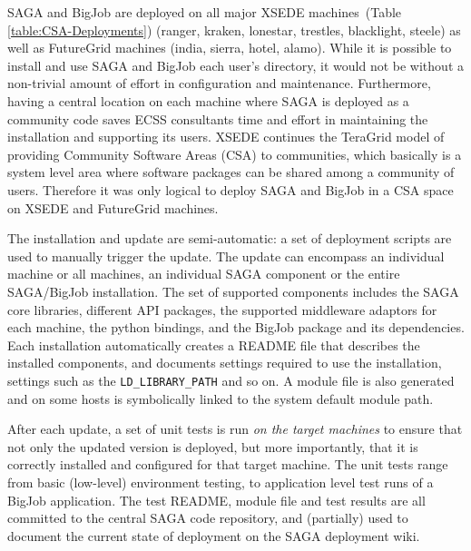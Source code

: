 \documentclass{sig-alternate}
\begin{document}
SAGA and BigJob are deployed on all major XSEDE
machines~(Table \ref{table:CSA-Deployments}) (ranger,
kraken, lonestar, trestles, blacklight, steele) as well as FutureGrid machines
(india, sierra, hotel, alamo). While it is possible to install and
use SAGA and BigJob each user's directory, it would not be without a non-trivial
amount of effort in configuration and maintenance. Furthermore, having a
central location on each machine where SAGA is deployed as a community code
saves ECSS consultants time and effort in maintaining the installation and
supporting its users. XSEDE continues the TeraGrid model of providing Community
Software Areas (CSA) to communities, which basically is a system
level area where software packages can be shared among a community of users.
Therefore it was only logical to deploy SAGA and BigJob in a CSA space on XSEDE
and FutureGrid machines.

The installation and update are semi-automatic: a set of deployment
scripts are used to manually trigger the update. The update can encompass an
individual machine or all machines, an individual SAGA component or the entire
SAGA/BigJob installation. The set of supported components includes the SAGA core
libraries, different API packages, the supported
middleware adaptors for each machine, the python bindings, and the
BigJob package and its dependencies. Each installation automatically creates a
README file that describes the installed components, and documents settings
required to use the installation, settings such as the
\texttt{LD\_LIBRARY\_PATH} and so on. A module file is also generated and on
some hosts is symbolically linked to the system default module path. 

After each update, a set of unit tests is run \textit{on the
target machines} to ensure that not only the updated version is deployed, but
more importantly, that it is correctly installed and
configured for that target machine. The unit tests range from basic
(low-level) environment testing, to application level test runs of a
BigJob application. The test README, module file and test results
are all committed to the central SAGA code repository, and
(partially) used to document the current state of deployment on the
SAGA deployment wiki.
\end{document}
